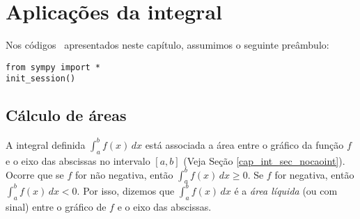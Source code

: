 
\chapter{Aplicações da integral}\label{cap_apint}
\thispagestyle{fancy}

\ifispython
\begin{obs}\label{obs:cap_apint_python}
  Nos códigos \python~apresentados neste capítulo, assumimos o seguinte preâmbulo:
\begin{verbatim}
from sympy import *
init_session()
\end{verbatim}
\end{obs}
\fi

\section{Cálculo de áreas}\label{cap_apint_sec_areas}

A integral definida $\int_a^b f(x)\,dx$ está associada a área entre o gráfico da função $f$ e o eixo das abscissas no intervalo $[a,b]$ (Veja Seção \ref{cap_int_sec_nocaoint}). Ocorre que se $f$ for não negativa, então $\int_a^b f(x)\,dx \geq 0$. Se $f$ for negativa, então $\int_a^b f(x)\,dx < 0$. Por isso, dizemos que $\int_a^b f(x)\,dx$ é a \emph{área líquida} (ou com sinal) entre o gráfico de $f$ e o eixo das abscissas.

